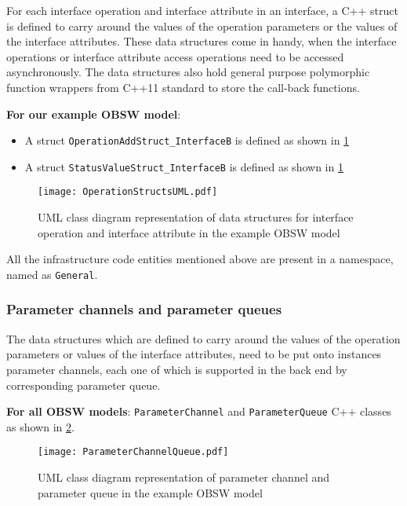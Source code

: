 For each interface operation and interface attribute in an interface, a C++ struct is defined to carry around the values of the operation parameters or the values of the interface attributes. These data structures come in handy, when the interface operations or interface attribute access operations need to be accessed asynchronously. The data structures also hold general purpose polymorphic function wrappers from C++11 standard to store the call-back functions. 

\textbf{For our example OBSW model}:
\begin{itemize}
\item A struct \texttt{OperationAdd\allowbreak Struct\_\allowbreak InterfaceB} is defined as shown in \cref{fig: Operation structs UML}
\item A struct \texttt{StatusValue\allowbreak Struct\_\allowbreak InterfaceB} is defined as shown in \cref{fig: Operation structs UML}
\end{itemize} 

\begin{figure}[h]
	\centering
	\texttt{[image: OperationStructsUML.pdf]}
	\caption{UML class diagram representation of data structures for interface operation and interface attribute in the example OBSW model}
	\label{fig: Operation structs UML}
\end{figure} 

All the infrastructure code entities mentioned above are present in a namespace, named as \texttt{General}.

\subsubsection{\textbf{Parameter channels and parameter queues}}
The data structures which are defined to carry around the values of the operation parameters or values of the interface attributes, need to be put onto instances parameter channels, each one of which is supported in the back end by corresponding parameter queue.

\textbf{For all OBSW models}: \texttt{Parameter\allowbreak Channel} and \texttt{Parameter\allowbreak Queue} C++ classes as shown in \cref{fig: Parameter channel UML}. 

\begin{figure}[h]
	\centering
	\texttt{[image: ParameterChannelQueue.pdf]}
	\caption{UML class diagram representation of parameter channel and parameter queue in the example OBSW model}
	\label{fig: Parameter channel UML}
\end{figure}

